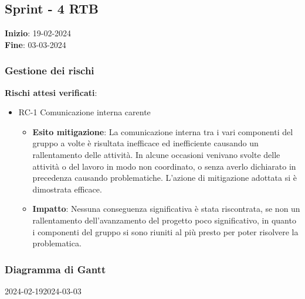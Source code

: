 \subsection{Sprint - 4 RTB}

\textbf{Inizio}: 19-02-2024 \\
\textbf{Fine}: 03-03-2024

\subsubsection{Gestione dei rischi}
\textbf{Rischi attesi verificati}:

\begin{itemize}
	\item RC-1 Comunicazione interna carente
	      \begin{itemize}
		      \item \textbf{Esito mitigazione}: La comunicazione interna tra i vari componenti del gruppo a volte è risultata inefficace ed inefficiente causando un rallentamento delle attività.
		            In alcune occasioni venivano svolte delle attività o del lavoro in modo non coordinato, o senza averlo dichiarato in precedenza causando problematiche.
		            L'azione di mitigazione adottata si è dimostrata efficace.
		      \item \textbf{Impatto}: Nessuna conseguenza significativa è stata
		            riscontrata, se non un rallentamento dell'avanzamento del progetto poco significativo, in quanto
		            i componenti del gruppo si sono riuniti al più presto per poter risolvere la problematica.
	      \end{itemize}
\end{itemize}

\subsubsection{Diagramma di Gantt}

\begin{ganttchart}[
		x unit=0.6cm, %
		y unit chart=0.6cm,
		bar/.style={fill=blue!50},
		bar height=0.5,
		time slot format=isodate,
		time slot unit=day,
		vgrid,
		today=2024-02-19,
		today rule/.style={draw=red, ultra thick}
	]{2024-02-19}{2024-03-03}
	 \\
	 \\
	 \\
	 \\
	 \\
\end{ganttchart}

